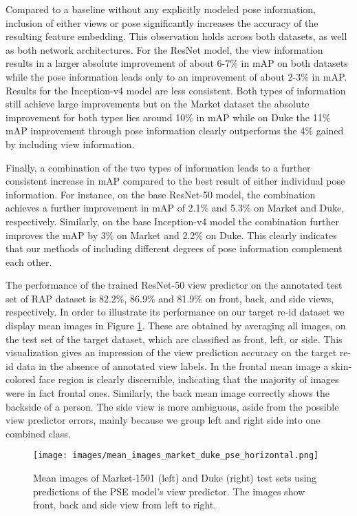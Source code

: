 \documentclass[10pt,twocolumn,letterpaper]{article}
\begin{document}
Compared to a baseline without any explicitly modeled pose information, inclusion of either views or pose significantly increases the accuracy of the resulting feature embedding. This observation holds across both datasets, as well as both network architectures. For the ResNet model, the view information results in a larger absolute improvement of about 6-7\% in mAP on both datasets while the pose information leads
only to an improvement of about 2-3\% in mAP. Results for the Inception-v4 model are less consistent.
Both types of information still achieve large improvements but on the Market dataset the absolute 
improvement for both types lies around 10\% in mAP while on Duke the 11\% mAP improvement through pose 
information clearly outperforms the 4\% gained by including view information. 


Finally, a combination of the two types of information leads to a further consistent increase in mAP compared to the best result of either individual pose information. For instance, on the base ResNet-50 model, the combination achieves a further improvement in mAP of 2.1\% and 5.3\% on Market and Duke, respectively. Similarly, on the base Inception-v4 model the combination further improves the mAP by 3\% on Market and 2.2\% on Duke. This clearly indicates that our methods of including different degrees
of pose information complement each other.

 The performance of the trained ResNet-50 view predictor on the annotated test set of RAP dataset is 82.2\%, 86.9\% and 81.9\% on front, back, and side views, respectively. In order to illustrate its performance on our target re-id dataset we display mean images in Figure \ref{fig:means}. These are obtained by averaging all images, on the test set of the target dataset, which are classified as front, left, or side. This visualization gives an impression of the view prediction accuracy on the target re-id data in the absence of annotated view labels. In the frontal mean image a skin-colored face region is clearly discernible, indicating that the majority of images were in fact frontal ones. Similarly, the back mean image correctly shows the backside of a person. The side view is more ambiguous, aside from the possible view predictor errors, mainly because we group left and right side into one combined class.



\begin{figure}[t]
\centering
\texttt{[image: images/mean\_images\_market\_duke\_pse\_horizontal.png]}
\caption{Mean images of Market-1501 (left) and Duke (right) test sets using predictions of the PSE model's view predictor. The images show front, back and side view from left to right.}
\label{fig:means}
\vspace{-.5cm}
\end{figure}
\end{document}
